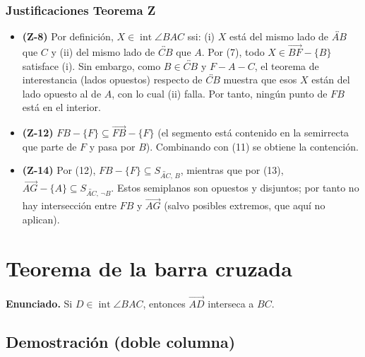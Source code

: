 \documentclass[12pt,letterpaper]{exam}
\begin{document}
\begin{tabularx}{\linewidth}{@{}L R@{}}
\end{tabularx}

\subsubsection*{Justificaciones Teorema Z}
\begin{itemize}[leftmargin=2.2em]
  \item \textbf{(Z-8)} \; Por definición, $X\in\operatorname{int}\angle BAC$ ssi: (i) $X$ está del mismo lado de $\overleftrightarrow{AB}$ que $C$ y (ii) del mismo lado de $\overleftrightarrow{CB}$ que $A$.  
  Por (7), todo $X\in\overrightarrow{BF}-\{B\}$ satisface (i). Sin embargo, como $B\in\overleftrightarrow{CB}$ y $F-A-C$, el teorema de interestancia (lados opuestos) respecto de $\overleftrightarrow{CB}$ muestra que esos $X$ están del lado opuesto al de $A$, con lo cual (ii) falla. Por tanto, ningún punto de $FB$ está en el interior.
  \item \textbf{(Z-12)} \; $FB-\{F\}\subseteq \overrightarrow{FB}-\{F\}$ (el segmento está contenido en la semirrecta que parte de $F$ y pasa por $B$). Combinando con (11) se obtiene la contención.
  \item \textbf{(Z-14)} \; Por (12), $FB-\{F\}\subseteq S_{\overleftrightarrow{AC},\,B}$, mientras que por (13), $\overrightarrow{AG}-\{A\}\subseteq S_{\overleftrightarrow{AC},\,\neg B}$. Estos semiplanos son opuestos y disjuntos; por tanto no hay intersección entre $FB$ y $\overrightarrow{AG}$ (salvo posibles extremos, que aquí no aplican).
\end{itemize}


\section*{Teorema de la barra cruzada}
\textbf{Enunciado.} Si $D\in\operatorname{int}\angle BAC$, entonces $\overrightarrow{AD}$ interseca a $BC$.

\subsection*{Demostración (doble columna)}
\end{document}
